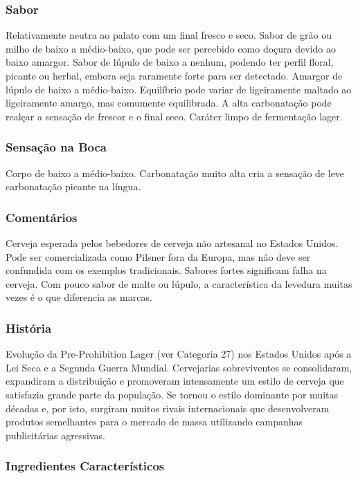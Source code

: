 \begin{multicols}{2}
\subsubsection*{Sabor}

Relativamente neutra ao palato com um final fresco e seco. Sabor de grão ou milho de baixo a médio-baixo, que pode ser percebido como doçura devido ao baixo amargor. Sabor de lúpulo de baixo a nenhum, podendo ter perfil floral, picante ou herbal, embora seja raramente forte para ser detectado. Amargor de lúpulo de baixo a médio-baixo. Equilíbrio pode variar de ligeiramente maltado ao ligeiramente amargo, mas comumente equilibrada. A alta carbonatação pode realçar a sensação de frescor e o final seco. Caráter limpo de fermentação lager.

\subsubsection*{Sensação na Boca}

Corpo de baixo a médio-baixo. Carbonatação muito alta cria a sensação de leve carbonatação picante na língua.

\subsubsection*{Comentários}

Cerveja esperada pelos bebedores de cerveja não artesanal no Estados Unidos. Pode ser comercializada como Pilsner fora da Europa, mas não deve ser confundida com os exemplos tradicionais. Sabores fortes significam falha na cerveja. Com pouco sabor de malte ou lúpulo, a característica da levedura muitas vezes é o que diferencia as marcas.

\subsubsection*{História}

Evolução da Pre-Prohibition Lager (ver Categoria 27) nos Estados Unidos após a Lei Seca e a Segunda Guerra Mundial. Cervejarias sobreviventes se consolidaram, expandiram a distribuição e promoveram intensamente um estilo de cerveja que satisfazia grande parte da população. Se tornou o estilo dominante por muitas décadas e, por isto, surgiram muitos rivais internacionais que desenvolveram produtos semelhantes para o mercado de massa utilizando campanhas publicitárias agressivas.

\subsubsection*{Ingredientes Característicos}


\end{multicols}
